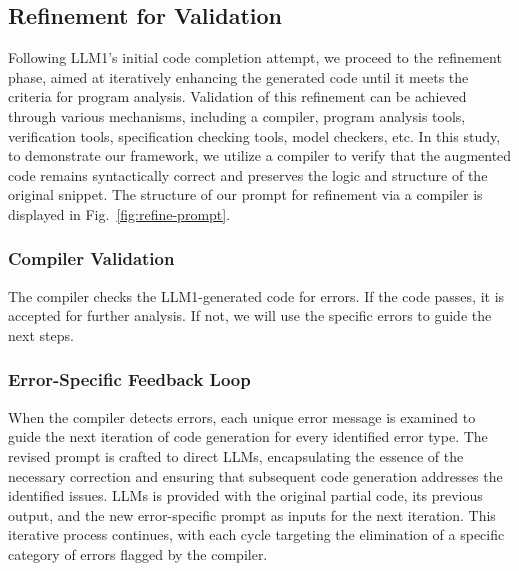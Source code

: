 
\subsection{Refinement for Validation}

% 


Following LLM1's initial code completion attempt, we proceed to the refinement phase, aimed at iteratively enhancing the generated code until it meets the criteria for program analysis. Validation of this refinement can be achieved through various mechanisms, including a compiler, program analysis tools, verification tools, specification checking tools, model checkers, etc. In this study, to demonstrate our framework, we utilize a compiler to verify that the augmented code remains syntactically correct and preserves the logic and structure of the original snippet. The structure of our prompt for refinement via a compiler
is displayed in Fig.~\ref{fig:refine-prompt}. 

\subsubsection{Compiler Validation}

The compiler checks the LLM1-generated code for errors. If the code passes, it is accepted for further analysis. If not, we will use the specific errors to guide the next steps.

\subsubsection{Error-Specific Feedback Loop}

%

When the compiler detects errors, each unique error message is examined to guide the next iteration of code generation for every identified error type. The revised prompt is crafted to direct LLMs, encapsulating the essence of the necessary correction and ensuring that subsequent code generation addresses the identified issues. LLMs is provided with the original partial code, its previous output, and the new error-specific prompt as inputs for the next iteration. This iterative process continues, with each cycle targeting the elimination of a specific category of errors flagged by the compiler.


